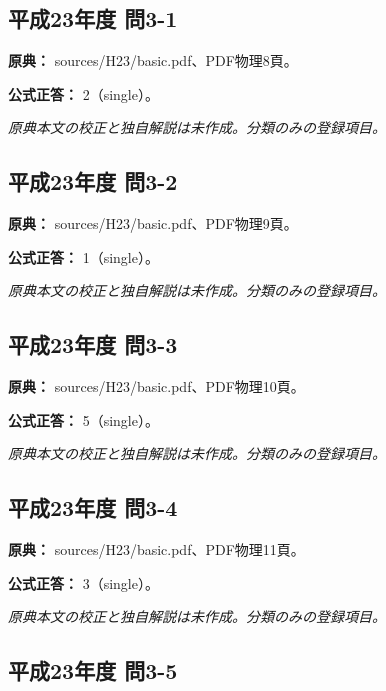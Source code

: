 \subsection{平成23年度 問3-1}
\label{q:h23-reg-basic-3-1}

\noindent\textbf{原典：} sources/H23/basic.pdf、PDF物理8頁。

\textbf{公式正答：} 2（single）。

\par\textit{原典本文の校正と独自解説は未作成。分類のみの登録項目。}

\subsection{平成23年度 問3-2}
\label{q:h23-reg-basic-3-2}

\noindent\textbf{原典：} sources/H23/basic.pdf、PDF物理9頁。

\textbf{公式正答：} 1（single）。

\par\textit{原典本文の校正と独自解説は未作成。分類のみの登録項目。}

\subsection{平成23年度 問3-3}
\label{q:h23-reg-basic-3-3}

\noindent\textbf{原典：} sources/H23/basic.pdf、PDF物理10頁。

\textbf{公式正答：} 5（single）。

\par\textit{原典本文の校正と独自解説は未作成。分類のみの登録項目。}

\subsection{平成23年度 問3-4}
\label{q:h23-reg-basic-3-4}

\noindent\textbf{原典：} sources/H23/basic.pdf、PDF物理11頁。

\textbf{公式正答：} 3（single）。

\par\textit{原典本文の校正と独自解説は未作成。分類のみの登録項目。}

\subsection{平成23年度 問3-5}
\label{q:h23-reg-basic-3-5}

